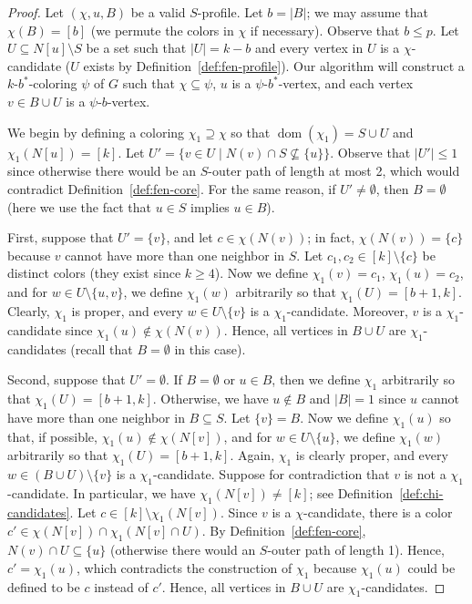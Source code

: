 \documentclass[runningheads, envcountsame]{llncs}
\newcommand{\sep}{\;|\;}
\newcommand{\seq}{\subseteq}
\DeclareMathOperator{\dom}{dom}
\begin{document}
\begin{proof}
Let $(\chi, u, B)$ be a valid $S$-profile.
Let $b = |B|$; we may assume that $\chi(B) = [b]$ (we permute the colors in $\chi$ if necessary).
Observe that $b \le p$.
Let $U \seq N[u] \setminus S$ be a set such that $|U| = k-b$ and every vertex in $U$ is a $\chi$-candidate ($U$ exists by Definition~\ref{def:fen-profile}).
Our algorithm will construct a $k$-$b^*$-coloring $\psi$ of $G$ such that $\chi \seq \psi$, $u$ is a $\psi$-$b^*$-vertex, and each vertex $v \in B \cup U$ is a $\psi$-$b$-vertex.

We begin by defining a coloring $\chi_1 \supseteq \chi$ so that $\dom(\chi_1) = S \cup U$ and $\chi_1(N[u]) = [k]$.
Let $U' = \{v \in U \sep N(v) \cap S \nsubseteq \{u\}\}$.
Observe that $|U'| \le 1$ since otherwise there would be an $S$-outer path of length at most 2, which would contradict Definition~\ref{def:fen-core}.
For the same reason, if $U' \ne \emptyset$, then $B = \emptyset$ (here we use the fact that $u \in S$ implies $u \in B$).

First, suppose that $U' = \{v\}$, and let $c \in \chi(N(v))$; in fact, $\chi(N(v)) = \{c\}$ because $v$ cannot have more than one neighbor in $S$.
Let $c_1, c_2 \in [k] \setminus \{c\}$ be distinct colors (they exist since $k \ge 4$).
Now we define $\chi_1(v) = c_1$, $\chi_1(u) = c_2$, and for $w \in U \setminus \{u ,v\}$, we define $\chi_1(w)$ arbitrarily so that $\chi_1(U) = [b+1, k]$.
Clearly, $\chi_1$ is proper, and every $w \in U \setminus \{v\}$ is a $\chi_1$-candidate.
Moreover, $v$ is a $\chi_1$-candidate since $\chi_1(u) \notin \chi(N(v))$.
Hence, all vertices in $B \cup U$ are $\chi_1$-candidates (recall that $B = \emptyset$ in this case).

Second, suppose that $U' = \emptyset$.
If $B = \emptyset$ or $u \in B$, then we define $\chi_1$ arbitrarily so that $\chi_1(U) = [b+1, k]$.
Otherwise, we have $u \notin B$ and $|B| = 1$ since $u$ cannot have more than one neighbor in $B \seq S$.
Let $\{v\} = B$.
Now we define $\chi_1(u)$ so that, if possible, $\chi_1(u) \notin \chi(N[v])$, and for $w \in U \setminus \{u\}$, we define $\chi_1(w)$ arbitrarily so that $\chi_1(U) = [b+1, k]$.
Again, $\chi_1$ is clearly proper, and every $w \in (B \cup U) \setminus \{v\}$ is a $\chi_1$-candidate.
Suppose for contradiction that $v$ is not a $\chi_1$-candidate.
In particular, we have $\chi_1(N[v]) \ne [k]$; see Definition~\ref{def:chi-candidates}.
Let $c \in [k] \setminus \chi_1(N[v])$.
Since $v$ is a $\chi$-candidate, there is a color $c' \in \chi(N[v]) \cap \chi_1(N[v] \cap U)$.
By Definition~\ref{def:fen-core}, $N(v) \cap U \seq \{u\}$ (otherwise there would an $S$-outer path of length 1).
Hence, $c' = \chi_1(u)$, which contradicts the construction of $\chi_1$ because $\chi_1(u)$ could be defined to be $c$ instead of $c'$.
Hence, all vertices in $B \cup U$ are $\chi_1$-candidates.


\end{proof}
\end{document}

